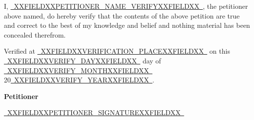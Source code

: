 \documentclass[12pt, a4paper]{article}
\newcommand{\fillline}[1]{\underline{~#1~}}
\begin{document}
\vspace{6pt}
\noindent I, \fillline{XXFIELDXXPETITIONER_NAME_VERIFYXXFIELDXX}, the petitioner above named, do hereby verify that the contents of the above petition are true and correct to the best of my knowledge and belief and nothing material has been concealed therefrom.

\vspace{12pt}
\noindent Verified at \fillline{XXFIELDXXVERIFICATION_PLACEXXFIELDXX} on this \fillline{XXFIELDXXVERIFY_DAYXXFIELDXX} day of \fillline{XXFIELDXXVERIFY_MONTHXXFIELDXX} 20\fillline{XXFIELDXXVERIFY_YEARXXFIELDXX}.

\vspace{20pt}
\noindent\hfill \textbf{Petitioner}

\noindent\hfill \fillline{XXFIELDXXPETITIONER_SIGNATUREXXFIELDXX}
\end{document}

